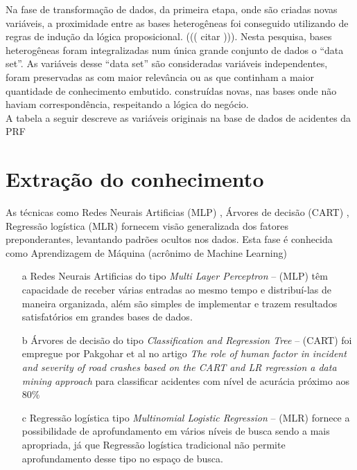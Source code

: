 Na fase de transformação de dados, da primeira etapa, onde são criadas novas variáveis, a proximidade entre as
bases heterogêneas foi conseguido utilizando de regras de indução da lógica proposicional. ((( citar ))).
Nesta pesquisa, bases heterogêneas foram integralizadas num única grande conjunto de dados o ``data set''. As variáveis desse ``data set''
são consideradas variáveis independentes, foram preservadas as com maior relevância ou as que continham a maior quantidade de conhecimento
embutido.  construídas novas, nas bases onde não haviam correspondência, respeitando a lógica do negócio.\\
A tabela a seguir descreve as variáveis originais na base de dados de acidentes da PRF 


\section{Extração do conhecimento}

As técnicas como Redes Neurais Artificias (MLP) \cite{DecisaoCredito}, Árvores de decisão (CART) \cite{DataMining}, Regressão logística (MLR) 
\cite{RegrecaoLog} fornecem visão generalizada dos fatores preponderantes, levantando padrões ocultos nos dados. Esta fase é conhecida como 
Aprendizagem de Máquina (acrônimo de Machine Learning)

\begin{itemize}
 \item[a] Redes Neurais Artificias do tipo \textit{ Multi Layer Perceptron}  -- (MLP) têm capacidade de receber várias entradas ao mesmo tempo e distribuí-las de maneira organizada, além 
	  são simples de implementar e trazem resultados satisfatórios em grandes bases de dados.
 
 \item[b] Árvores de decisão do tipo \textit{ Classification and Regression Tree}  -- (CART) foi empregue por Pakgohar et al no artigo 
	  \textit{The role of human factor in incident and severity of road crashes based on the CART and LR regression a data mining approach}  para classificar acidentes 
	  com nível de acurácia próximo aos 80\%

 \item[c] Regressão logística tipo \textit{Multinomial Logistic Regression} -- (MLR) fornece a possibilidade de aprofundamento em vários níveis de busca sendo a mais apropriada, já que Regressão logística 
	  tradicional não permite aprofundamento desse tipo no espaço de busca.
\end{itemize}


